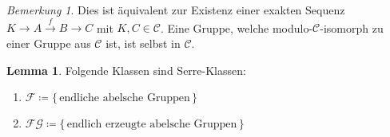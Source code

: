 \documentclass[11pt, a4paper, german]{article}
\theoremstyle{definition}
\newtheorem{lem}{Lemma}
\theoremstyle{remark}
\newtheorem*{bem}{Bemerkung}
\newcommand{\SC}{\mathcal{C}} %
\newcommand{\FG}{\mathcal{FG}} %
\newcommand{\F}{\mathcal{F}} %
\begin{document}
\vspace{-1.5em}
\begin{bem}
  Dies ist äquivalent zur Existenz einer exakten Sequenz $K \to A \xrightarrow{f} B \to C$ mit $K, C \in \SC$.
  Eine Gruppe, welche modulo-$\SC$-isomorph zu einer Gruppe aus $\SC$ ist, ist selbst in $\SC$.
\end{bem}

\begin{lem}
  Folgende Klassen sind Serre-Klassen:
  \begin{enumerate}[label=\alph*)]
    \item $\F \coloneqq \{\, \text{endliche abelsche Gruppen} \,\}$
    \item $\FG \coloneqq \{\, \text{endlich erzeugte abelsche Gruppen} \,\}$
  \end{enumerate}
\end{lem}
\end{document}
